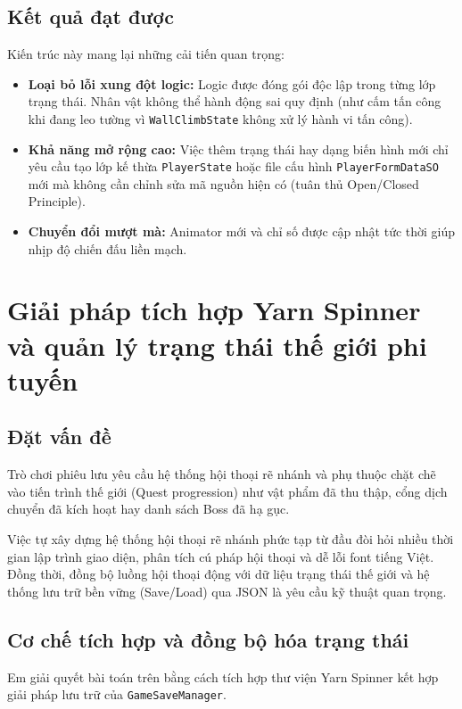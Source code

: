 \subsection{Kết quả đạt được}
Kiến trúc này mang lại những cải tiến quan trọng:
\begin{itemize}
    \item \textbf{Loại bỏ lỗi xung đột logic:} Logic được đóng gói độc lập trong từng lớp trạng thái. Nhân vật không thể hành động sai quy định (như cấm tấn công khi đang leo tường vì \texttt{WallClimbState} không xử lý hành vi tấn công).
    \item \textbf{Khả năng mở rộng cao:} Việc thêm trạng thái hay dạng biến hình mới chỉ yêu cầu tạo lớp kế thừa \texttt{PlayerState} hoặc file cấu hình \texttt{PlayerFormDataSO} mới mà không cần chỉnh sửa mã nguồn hiện có (tuân thủ Open/Closed Principle).
    \item \textbf{Chuyển đổi mượt mà:} Animator mới và chỉ số được cập nhật tức thời giúp nhịp độ chiến đấu liền mạch.
\end{itemize}

\section{Giải pháp tích hợp Yarn Spinner và quản lý trạng thái thế giới phi tuyến}

\subsection{Đặt vấn đề}
Trò chơi phiêu lưu yêu cầu hệ thống hội thoại rẽ nhánh và phụ thuộc chặt chẽ vào tiến trình thế giới (Quest progression) như vật phẩm đã thu thập, cổng dịch chuyển đã kích hoạt hay danh sách Boss đã hạ gục.

Việc tự xây dựng hệ thống hội thoại rẽ nhánh phức tạp từ đầu đòi hỏi nhiều thời gian lập trình giao diện, phân tích cú pháp hội thoại và dễ lỗi font tiếng Việt. Đồng thời, đồng bộ luồng hội thoại động với dữ liệu trạng thái thế giới và hệ thống lưu trữ bền vững (Save/Load) qua JSON là yêu cầu kỹ thuật quan trọng.

\subsection{Cơ chế tích hợp và đồng bộ hóa trạng thái}
Em giải quyết bài toán trên bằng cách tích hợp thư viện Yarn Spinner kết hợp giải pháp lưu trữ của \texttt{GameSaveManager}.

